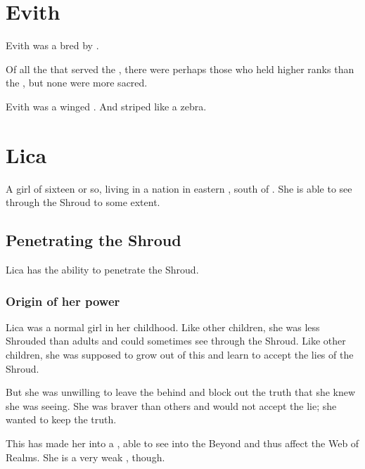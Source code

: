 \section{Evith}
Evith was a  bred by . 

Of all the \humans{} that served the \resphain, there were perhaps those who held higher ranks than the \naorim, but none were more sacred. 

Evith was a winged . 
And striped like a zebra. 
















\section{Lica}
A \human{} girl of sixteen or so, living in a nation in eastern \Velcad{}, south of \Redce. 
She is able to see through the Shroud to some extent. 









\subsection{Penetrating the Shroud}
Lica has the ability to penetrate the Shroud. 





\subsubsection{Origin of her power}
Lica was a normal girl in her childhood. 
Like other children, she was less Shrouded than adults and could sometimes see through the Shroud. 
Like other children, she was supposed to grow out of this and learn to accept the lies of the Shroud. 

But she was unwilling to leave the  behind and block out the truth that she knew she was seeing. 
She was braver than others and would not accept the lie; she wanted to keep the truth. 

This has made her into a \vertex, able to see into the Beyond and thus affect the Web of Realms. 
She is a very weak \vertex, though. 











